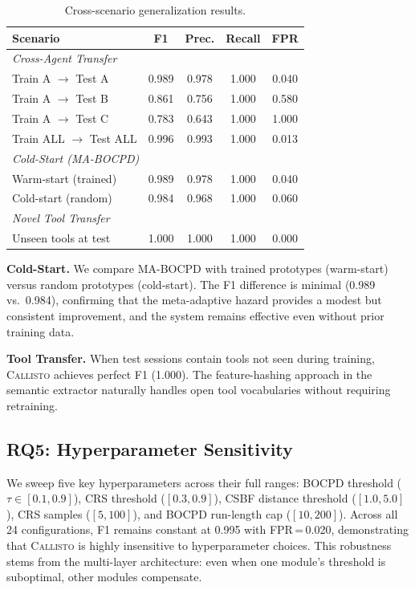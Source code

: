 \documentclass[conference,compsoc]{IEEEtran}
\newcommand{\system}{\textsc{Callisto}}
\begin{document}
\begin{table}[t]
\centering
\caption{Cross-scenario generalization results.}
\label{tab:cross}
\small
\begin{tabular}{@{}lcccc@{}}
\toprule
Scenario & F1 & Prec. & Recall & FPR \\
\midrule
\multicolumn{5}{l}{\textit{Cross-Agent Transfer}} \\
\quad Train A $\to$ Test A & 0.989 & 0.978 & 1.000 & 0.040 \\
\quad Train A $\to$ Test B & 0.861 & 0.756 & 1.000 & 0.580 \\
\quad Train A $\to$ Test C & 0.783 & 0.643 & 1.000 & 1.000 \\
\quad Train ALL $\to$ Test ALL & 0.996 & 0.993 & 1.000 & 0.013 \\
\midrule
\multicolumn{5}{l}{\textit{Cold-Start (MA-BOCPD)}} \\
\quad Warm-start (trained) & 0.989 & 0.978 & 1.000 & 0.040 \\
\quad Cold-start (random) & 0.984 & 0.968 & 1.000 & 0.060 \\
\midrule
\multicolumn{5}{l}{\textit{Novel Tool Transfer}} \\
\quad Unseen tools at test & 1.000 & 1.000 & 1.000 & 0.000 \\
\bottomrule
\end{tabular}
\end{table}

\textbf{Cold-Start.} We compare MA-BOCPD with trained prototypes (warm-start) versus random prototypes (cold-start). The F1 difference is minimal (0.989 vs.\ 0.984), confirming that the meta-adaptive hazard provides a modest but consistent improvement, and the system remains effective even without prior training data.

\textbf{Tool Transfer.} When test sessions contain tools not seen during training, \system{} achieves perfect F1 (1.000). The feature-hashing approach in the semantic extractor naturally handles open tool vocabularies without requiring retraining.

\subsection{RQ5: Hyperparameter Sensitivity}
\label{sec:sensitivity}

We sweep five key hyperparameters across their full ranges: BOCPD threshold ($\tau \in [0.1, 0.9]$), CRS threshold ($[0.3, 0.9]$), CSBF distance threshold ($[1.0, 5.0]$), CRS samples ($[5, 100]$), and BOCPD run-length cap ($[10, 200]$). Across all 24 configurations, F1 remains constant at 0.995 with FPR\,=\,0.020, demonstrating that \system{} is highly insensitive to hyperparameter choices. This robustness stems from the multi-layer architecture: even when one module's threshold is suboptimal, other modules compensate.
\end{document}
